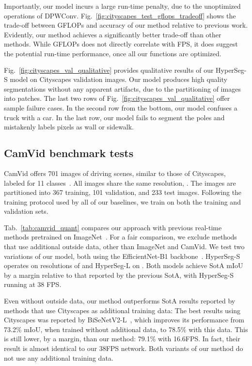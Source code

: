 \documentclass[final]{cvpr}
\begin{document}
Importantly, our model incurs a large run-time penalty, due to the unoptimized operations of DPWConv. Fig.~\ref{fig:cityscapes_test_gflops_tradeoff} shows the trade-off between GFLOPs and accuracy of our method relative to previous work. Evidently, our method achieves a significantly better trade-off than other methods. While GFLOPs does not directly correlate with FPS, it does suggest the potential run-time performance, once all our functions are optimized.

Fig.~\ref{fig:cityscapes_val_qualitative} provides qualitative results of our HyperSeg-S model on Cityscapes validation images. Our model produces high quality segmentations without any apparent artifacts, due to the partitioning of images into patches. The last two rows of Fig.~\ref{fig:cityscapes_val_qualitative} offer sample failure cases. In the second row from the bottom, our model confuses a truck with a car. In the last row, our model fails to segment the poles and mistakenly labels pixels as wall or sidewalk.




\subsection{CamVid benchmark tests}
\label{subsec:CamVid dataset}
CamVid offers 701 images of driving scenes, similar to those of Cityscapes, labeled for 11 classes~\cite{brostow2009semantic}. All images share the same resolution, . The images are partitioned into 367 training, 101 validation, and 233 test images. Following the training protocol used by all of our baselines, we train on both the training and validation sets. 

Tab.~\ref{tab:camvid_quant} compares our approach with previous real-time methods pretrained on ImageNet~\cite{russakovsky2015imagenet}. For a fair comparison, we exclude methods that use additional outside data, other than ImageNet and CamVid. We test two variations of our model, both using the EfficientNet-B1 backbone~\cite{tan2019efficientnet}. HyperSeg-S operates on resolutions of  and HyperSeg-L on . Both models achieve SotA mIoU by a margin relative to that reported by the previous SotA, with HyperSeg-S running at 38 FPS.


Even without outside data, our method outperforms SotA results reported by methods that use Cityscapes as additional training data: The best results using Cityscapes was reported by BiSeNetV2-L~\cite{yu2020bisenet}, which improves its performance from 73.2\% mIoU, when trained without additional data, to 78.5\% with this data. This is still lower, by a margin, than our method: 79.1\% with 16.6FPS. In fact, their result is almost identical to our 38FPS network. Both variants of our method do not use any additional training data.
\end{document}

